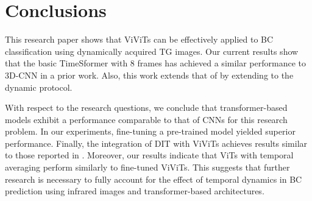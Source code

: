 \documentclass[runningheads]{llncs}
\begin{document}
\section{Conclusions}
\label{sec:conclusions}

This research paper shows that \ac{ViViTs} can be effectively applied
to \ac{BC} classification using dynamically acquired \ac{TG}
images. Our current results show that the basic TimeSformer with 8
frames has achieved a similar performance to 3D-CNN in a prior
work. Also, this work extends that of \cite{Garia2023} by extending to
the dynamic protocol.

With respect to the research questions, we conclude that
transformer-based models exhibit a performance comparable to that of
\ac{CNNs} for this research problem. In our experiments, fine-tuning a
pre-trained model yielded superior performance. Finally, the
integration of \ac{DIT} with \ac{ViViTs} achieves results similar to
those reported in \cite{Garia2023}. Moreover, our results indicate
that \ac{ViTs} with temporal averaging perform similarly to fine-tuned
\ac{ViViTs}. This suggests that further research is necessary to fully
account for the effect of temporal dynamics in \ac{BC} prediction
using infrared images and transformer-based architectures.




\end{document}
